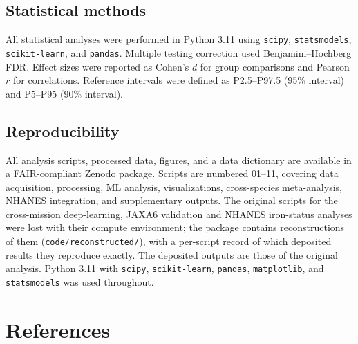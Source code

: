 \documentclass[11pt,a4paper]{article}
\begin{document}
\subsection{Statistical methods}

All statistical analyses were performed in Python 3.11 using \texttt{scipy}, \texttt{statsmodels}, \texttt{scikit-learn}, and \texttt{pandas}. Multiple testing correction used Benjamini--Hochberg FDR. Effect sizes were reported as Cohen's $d$ for group comparisons and Pearson $r$ for correlations. Reference intervals were defined as P2.5--P97.5 (95\% interval) and P5--P95 (90\% interval).

\subsection{Reproducibility}

All analysis scripts, processed data, figures, and a data dictionary are available in a FAIR-compliant Zenodo package. Scripts are numbered 01--11, covering data acquisition, processing, ML analysis, visualizations, cross-species meta-analysis, NHANES integration, and supplementary outputs. The original scripts for the cross-mission deep-learning, JAXA6 validation and NHANES iron-status analyses were lost with their compute environment; the package contains reconstructions of them (\texttt{code/reconstructed/}), with a per-script record of which deposited results they reproduce exactly. The deposited outputs are those of the original analysis. Python 3.11 with \texttt{scipy}, \texttt{scikit-learn}, \texttt{pandas}, \texttt{matplotlib}, and \texttt{statsmodels} was used throughout.

\section*{References}
\end{document}
